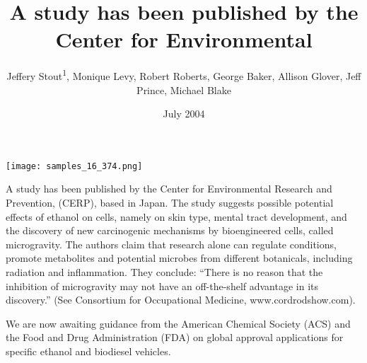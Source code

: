 \documentclass{article}
\title{A study has been published by the Center for Environmental}
\author{Jeffery Stout\textsuperscript{1},  Monique Levy,  Robert Roberts,  George Baker,  Allison Glover,  Jeff Prince,  Michael Blake}
\affil{\textsuperscript{1}University of Michigan-Dearborn}
\date{July 2004}
\begin{document}
\maketitle

\begin{center}
\begin{minipage}{0.75\linewidth}
\texttt{[image: samples\_16\_374.png]}
\end{minipage}
\end{center}

A study has been published by the Center for Environmental Research and Prevention, (CERP), based in Japan. The study suggests possible potential effects of ethanol on cells, namely on skin type, mental tract development, and the discovery of new carcinogenic mechanisms by bioengineered cells, called microgravity. The authors claim that research alone can regulate conditions, promote metabolites and potential microbes from different botanicals, including radiation and inflammation. They conclude: “There is no reason that the inhibition of microgravity may not have an off-the-shelf advantage in its discovery.” (See Consortium for Occupational Medicine, www.cordrodshow.com).

We are now awaiting guidance from the American Chemical Society (ACS) and the Food and Drug Administration (FDA) on global approval applications for specific ethanol and biodiesel vehicles.
\end{document}
